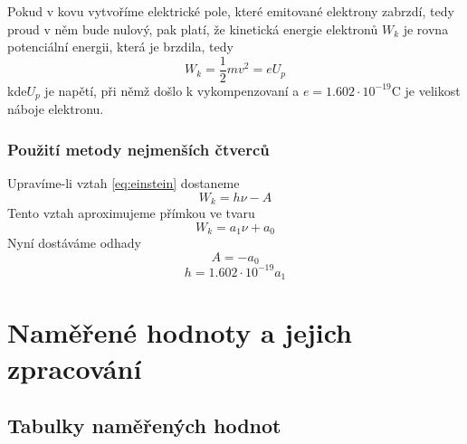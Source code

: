 \documentclass[titlepage]{article}
\begin{document}
Pokud v kovu vytvoříme elektrické pole, které emitované elektrony zabrzdí, tedy proud v něm bude nulový, pak platí, že kinetická energie elektronů $W_k$ je rovna potenciální energii, která je brzdila, tedy
\begin{equation}\label{eq:energy}
 W_k = \frac{1}{2}mv^2=eU_p
\end{equation}
kde$U_p$ je napětí, při němž došlo k vykompenzovaní a $ e = 1.602 \cdot 10^{-19} \si{\coulomb}$ je velikost náboje elektronu.

\subsubsection{Použití metody nejmenších čtverců}
Upravíme-li vztah \eqref{eq:einstein} dostaneme
\begin{equation}
 W_k = h\nu - A
\end{equation}
Tento vztah aproximujeme přímkou ve tvaru
\begin{equation}\label{eq:squares}
 W_k = a_1\nu+a_0
\end{equation}
Nyní dostáváme odhady
\begin{equation}\label{eq:work}
 A = -a_0
\end{equation}
\begin{equation}\label{eq:planck}
 h = 1.602 \cdot 10^{-19}a_1
\end{equation}

\newpage
\section{Naměřené hodnoty a jejich zpracování}
\subsection{Tabulky naměřených hodnot}
\end{document}
